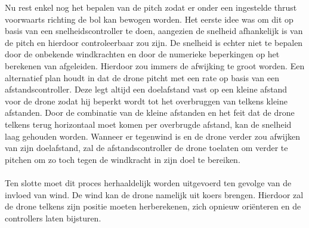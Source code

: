 Nu rest enkel nog het bepalen van de pitch zodat er onder een ingestelde thrust voorwaarts richting de bol kan bewogen worden. Het eerste idee was om dit op basis van een snelheidscontroller te doen, aangezien de snelheid afhankelijk is van de pitch en hierdoor controleerbaar zou zijn. De snelheid is echter niet te bepalen door de onbekende windkrachten en door de numerieke beperkingen op het berekenen van afgeleiden. Hierdoor zou immers de afwijking te groot worden. Een alternatief plan houdt in dat de drone pitcht met een rate op basis van een afstandscontroller. Deze legt altijd een doelafstand vast op een kleine afstand voor de drone zodat hij beperkt wordt tot het overbruggen van telkens kleine afstanden. Door de combinatie van de kleine afstanden en het feit dat de drone telkens terug horizontaal moet komen per overbrugde afstand, kan de snelheid laag gehouden worden. Wanneer er tegenwind is en de drone verder zou afwijken van zijn doelafstand, zal de afstandscontroller de drone toelaten om verder te pitchen om zo toch tegen de windkracht in zijn doel te bereiken.
\\
\\
Ten slotte moet dit proces herhaaldelijk worden uitgevoerd ten gevolge van de invloed van wind. De wind kan de drone namelijk uit koers brengen. Hierdoor zal de drone telkens zijn positie moeten herberekenen, zich opnieuw ori\"enteren en de controllers laten bijsturen.